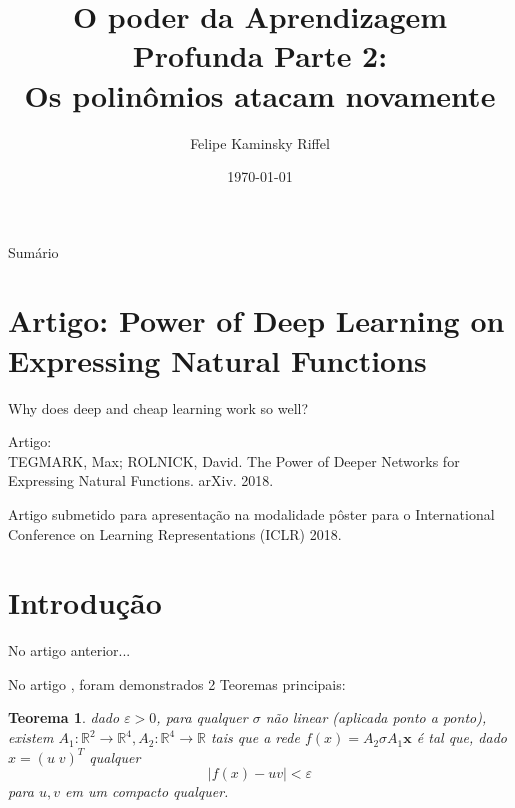 \documentclass{beamer}
\title{O poder da Aprendizagem Profunda Parte 2: \\
Os polinômios atacam novamente}
\author{Felipe Kaminsky Riffel}
\date{\today}
\institute{Universidade Federal de Santa Catarina}
\newtheorem{teo}{Teorema}[section]
\theoremstyle{definition}
\begin{document}
{ 
\frame{\titlepage}}

\begin{frame}{Sumário}
    \tableofcontents
\end{frame}
  

\section{Artigo: Power of Deep Learning on Expressing Natural Functions}    
\begin{frame}
\tableofcontents[currentsection]
\end{frame}

\begin{frame}{Why does deep and cheap learning work so well?}

    Artigo: \\
    
    TEGMARK, Max; ROLNICK, David. The Power of Deeper Networks for Expressing Natural Functions. arXiv. 2018. \cite{rolnick2018}

    \vspace{1em}
    Artigo submetido para apresentação na modalidade pôster para o International Conference on Learning Representations (ICLR) 2018.

\end{frame}

\section{Introdução}
\begin{frame}
    \tableofcontents[currentsection]
\end{frame}

\begin{frame}{No artigo anterior...}

    No artigo \cite{Lin2017}, foram demonstrados 2 Teoremas principais:

    \begin{teo}
        dado $\varepsilon>0$, para qualquer $\sigma$ não linear (aplicada ponto a ponto), existem  $A_1:\mathbb R^2 \to \mathbb R^4, A_2:\mathbb R^4 \to \mathbb R$ tais que a rede $f(x) = A_2 \sigma A_1 \mathbf{x}$ é tal que, dado $x=(u \; v)^T$ qualquer
    \[
        |f(x) - uv|<\varepsilon
    \]
    para $u,v$ em um compacto qualquer.
    \end{teo}

\end{frame}
\end{document}
